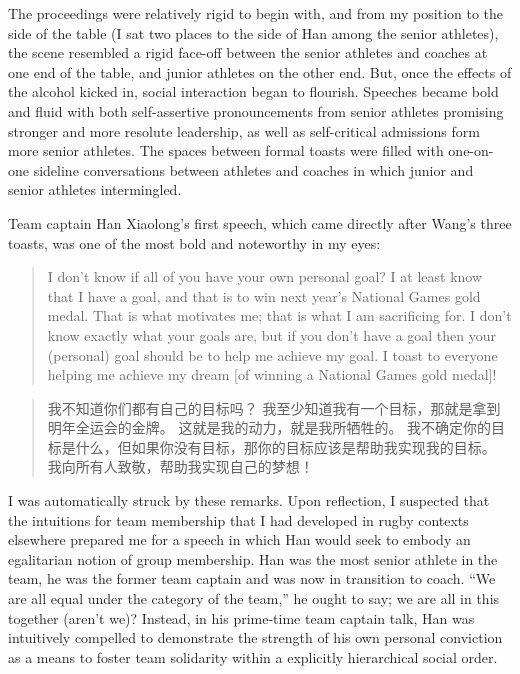 \begin{CJK}{UTF8}{gbsn}
  The proceedings were relatively rigid to begin with, and from my position to the side of the table (I sat two places to the side of Han among the senior athletes), the scene resembled a rigid face-off between the senior athletes and coaches at one end of the table, and junior athletes on the other end.  But, once the effects of the alcohol kicked in, social interaction began to flourish.  Speeches became bold and fluid with both self-assertive pronouncements from senior athletes promising stronger and more resolute leadership, as well as self-critical admissions form more senior athletes. The spaces between formal toasts were filled with one-on-one sideline conversations between athletes and coaches in which junior and senior athletes intermingled.

  Team captain Han Xiaolong's first speech, which came directly after Wang's three toasts, was one of the most bold and noteworthy in my eyes:

       \begin{quote}
         I don't know if all of you have your own personal goal?  I at least know that I have a goal, and that is to win next year's National Games gold medal.  That is what motivates me; that is what I am sacrificing for.  I don't know exactly what your goals are, but if you don't have a goal then your (personal) goal should be to help me achieve my goal.  I toast to everyone helping me achieve my dream [of winning a National Games gold medal]!
       \end{quote}
       \begin{quote}
           我不知道你们都有自己的目标吗？ 我至少知道我有一个目标，那就是拿到明年全运会的金牌。 这就是我的动力，就是我所牺牲的。 我不确定你的目标是什么，但如果你没有目标，那你的目标应该是帮助我实现我的目标。 我向所有人致敬，帮助我实现自己的梦想！
       \end{quote}

  I was automatically struck by these remarks.  Upon reflection, I suspected that the intuitions for team membership that I had developed in rugby contexts elsewhere prepared me for a speech in which Han would seek to embody an egalitarian notion of group membership. Han was the most senior athlete in the team, he was the former team captain and was now in transition to coach.  ``We are all equal under the category of the team,'' he ought to say; we are all in this together (aren't we)?  Instead, in his prime-time team captain talk, Han was intuitively compelled to demonstrate the strength of his own personal conviction as a means to foster team solidarity within a explicitly hierarchical social order.





\end{CJK}
